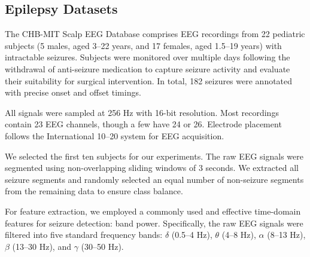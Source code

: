 \documentclass[journal,twocolumn]{IEEEtran}
\begin{document}
\subsection{Epilepsy Datasets}
The CHB-MIT Scalp EEG Database comprises EEG recordings from 22 pediatric subjects (5 males, aged 3–22 years, and 17 females, aged 1.5–19 years) with intractable seizures. Subjects were monitored over multiple days following the withdrawal of anti-seizure medication to capture seizure activity and evaluate their suitability for surgical intervention. In total, 182 seizures were annotated with precise onset and offset timings.

All signals were sampled at 256 Hz with 16-bit resolution. Most recordings contain 23 EEG channels, though a few have 24 or 26. Electrode placement follows the International 10–20 system for EEG acquisition.

We selected the first ten subjects for our experiments. The raw EEG signals were segmented using non-overlapping sliding windows of 3 seconds. We extracted all seizure segments and randomly selected an equal number of non-seizure segments from the remaining data to ensure class balance.

For feature extraction, we employed a commonly used and effective time-domain features for seizure detection: band power. Specifically, the raw EEG signals were filtered into five standard frequency bands: $\delta$ (0.5–4 Hz), $\theta$ (4–8 Hz), $\alpha$ (8–13 Hz), $\beta$ (13–30 Hz), and $\gamma$ (30–50 Hz). 
\end{document}
